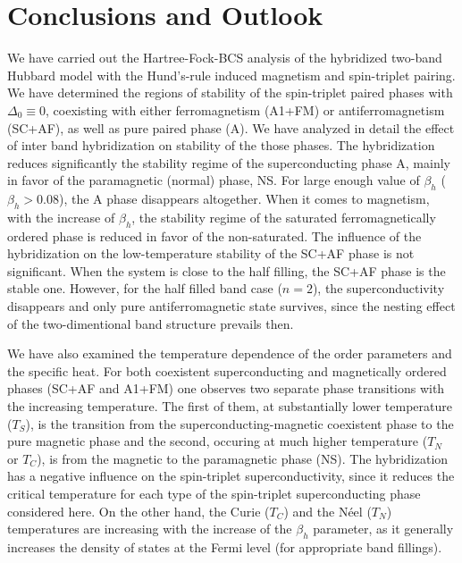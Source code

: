 \documentclass[aps,prb,showpacs,reprint]{revtex4-1}
\begin{document}


\section{Conclusions and Outlook}\label{sec:conclusions}
We have carried out the Hartree-Fock-BCS analysis of the hybridized two-band
Hubbard model with the Hund's-rule induced magnetism and spin-triplet pairing.
We
have determined the regions of stability of the spin-triplet paired phases with
$\Delta_0\equiv 0$, coexisting with either ferromagnetism (A1+FM) or
antiferromagnetism (SC+AF), as well as pure paired phase (A). We have analyzed in detail
the effect of
inter band hybridization on stability of the those phases.
The hybridization reduces
significantly
the stability regime of the superconducting phase A, mainly in favor of the
paramagnetic (normal) phase, NS. For large enough value of
$\beta_h$ ($\beta_h>0.08$), the A phase disappears altogether. When
it comes to magnetism, with the increase of $\beta_h$, the stability
regime of the saturated ferromagnetically ordered phase is reduced in favor
of the non-saturated. The
influence of the hybridization on the low-temperature stability of the SC+AF
phase is not significant. When the system is close to the half filling, the
SC+AF
phase is the stable one. However, for the half filled band case ($n=2$), the
superconductivity disappears and
only pure antiferromagnetic state survives, since the nesting effect of the two-dimentional band structure prevails then. 

We have also examined the temperature
dependence of the order parameters and the specific heat. For both coexistent
superconducting and magnetically ordered phases (SC+AF and A1+FM) one observes
two separate phase transitions with the increasing temperature. The first of
them, at substantially lower temperature ($T_S$), is the transition from the
superconducting-magnetic coexistent phase to the
pure magnetic phase and the second, occuring at much higher temperature ($T_N
$ or $T_C$), is from the magnetic to the paramagnetic phase (NS). The
hybridization has a negative
influence on the spin-triplet superconductivity, since it reduces the
critical
temperature for each type of the spin-triplet superconducting phase considered
here.
On the other hand, the Curie ($T_C$) and the N\'{e}el ($T_N$) temperatures are
increasing
with the increase of the $\beta_h$ parameter, as it generally increases the
density of states at the Fermi level (for appropriate band fillings). 
\end{document}

